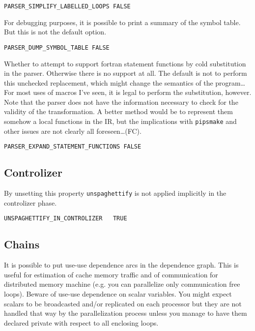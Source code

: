 \begin{verbatim}
PARSER_SIMPLIFY_LABELLED_LOOPS FALSE
\end{verbatim}

For debugging purposes, it is possible to print a summary of the symbol
table. But this is not the default option.

\begin{verbatim}
PARSER_DUMP_SYMBOL_TABLE FALSE
\end{verbatim}

Whether to attempt to support fortran statement functions by cold
substitution in the parser. Otherwise there is no support at all.
The default is not to perform this unchecked replacement, which might 
change the semantics of the program\ldots For most uses of macros I've
seen, it is legal to perform the substitution, however. Note that the
parser does not have the information necessary to check for the validity
of the transformation. A better method would be to represent them somehow
a local functions in the IR, but the implications with \texttt{pipsmake} 
and other issues are not clearly all foreseen\ldots (FC).
\begin{verbatim}
PARSER_EXPAND_STATEMENT_FUNCTIONS FALSE
\end{verbatim}


\subsection{Controlizer}

By unsetting this property \verb|unspaghettify| is not applied
implicitly in the controlizer phase.

\begin{verbatim}
UNSPAGHETTIFY_IN_CONTROLIZER   TRUE
\end{verbatim}



\subsection{Chains}

It is possible to put use-use dependence arcs in the dependence graph.
This is useful for estimation of cache memory traffic and of
communication for distributed memory machine (e.g. you can parallelize
only communication free loops). Beware of use-use dependence on scalar
variables. You might expect scalars to be broadcasted and/or replicated
on each processor but they are not handled that way by the
parallelization process unless you manage to have them
declared private with respect to all enclosing loops.


